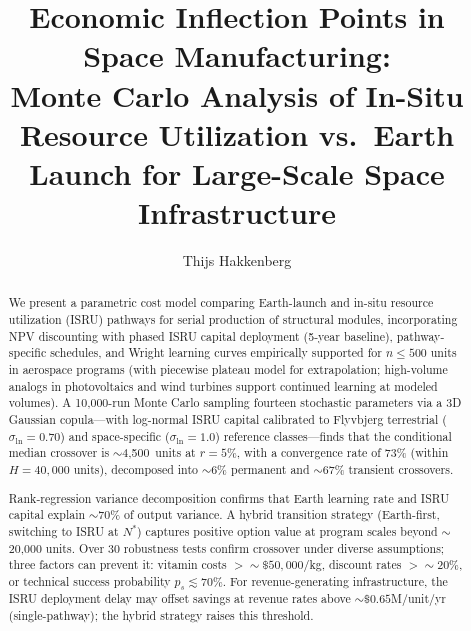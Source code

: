 \documentclass[preprint,12pt]{elsarticle}
\begin{document}
\begin{frontmatter}

\title{Economic Inflection Points in Space Manufacturing:\\ Monte Carlo Analysis of In-Situ Resource Utilization vs.\ Earth Launch for Large-Scale Space Infrastructure}

\author[dyson]{Thijs Hakkenberg}

\address[dyson]{Project Dyson, Open Research Initiative}

\begin{abstract}
We present a parametric cost model comparing Earth-launch and in-situ resource utilization (ISRU) pathways for serial production of structural modules, incorporating NPV discounting with phased ISRU capital deployment (5-year baseline), pathway-specific schedules, and Wright learning curves empirically supported for $n \leq 500$ units in aerospace programs (with piecewise plateau model for extrapolation; high-volume analogs in photovoltaics \cite{kavlak2018} and wind turbines \cite{rubin2015} support continued learning at modeled volumes). A 10{,}000-run Monte Carlo sampling fourteen stochastic parameters via a 3D Gaussian copula---with log-normal ISRU capital calibrated to Flyvbjerg terrestrial ($\sigma_{\ln} = 0.70$) and space-specific ($\sigma_{\ln} = 1.0$) reference classes---finds that the conditional median crossover is ${\sim}$4{,}500~units at $r = 5\%$, with a convergence rate of 73\% (within $H = 40{,}000$ units), decomposed into ${\sim}$6\% permanent and ${\sim}$67\% transient crossovers.

Rank-regression variance decomposition confirms that Earth learning rate and ISRU capital explain ${\sim}70\%$ of output variance. A hybrid transition strategy (Earth-first, switching to ISRU at $N^*$) captures positive option value at program scales beyond ${\sim}$20{,}000 units. Over 30 robustness tests confirm crossover under diverse assumptions; three factors can prevent it: vitamin costs $> {\sim}\$50{,}000$/kg, discount rates $> {\sim}20\%$, or technical success probability $p_s \lesssim 70\%$. For revenue-generating infrastructure, the ISRU deployment delay may offset savings at revenue rates above ${\sim}\$0.65$M/unit/yr (single-pathway); the hybrid strategy raises this threshold.
\end{abstract}


\end{frontmatter}
\end{document}

